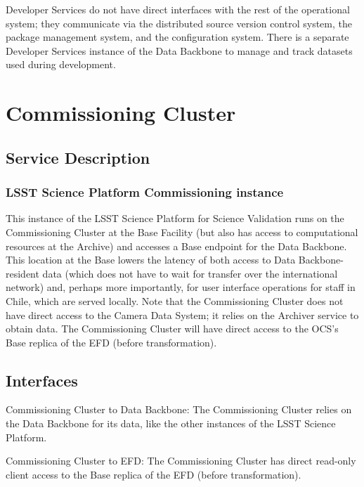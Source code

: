 \documentclass[DM,toc]{lsstdoc}
\begin{document}
Developer Services do not have direct interfaces with the rest of the
operational system; they communicate via the distributed source version control
system, the package management system, and the configuration system.  There is
a separate Developer Services instance of the Data Backbone to manage and track
datasets used during development.


\section{Commissioning Cluster}\label{commissioning-cluster}

\subsection{Service Description}\label{commcluster-service}

\subsubsection{LSST Science Platform Commissioning
instance}\label{lsst-science-platform-commissioning-instance}

This instance of the LSST Science Platform for Science Validation runs
on the Commissioning Cluster at the Base Facility (but also has access
to computational resources at the Archive) and accesses a Base endpoint
for the Data Backbone. This location at the Base lowers the latency of
both access to Data Backbone-resident data (which does not have to wait
for transfer over the international network) and, perhaps more
importantly, for user interface operations for staff in Chile, which are
served locally. Note that the Commissioning Cluster does not have direct
access to the Camera Data System; it relies on the Archiver service to
obtain data. The Commissioning Cluster will have direct access to the
OCS's Base replica of the EFD (before transformation).

\subsection{Interfaces}\label{commcluster-interfaces}

Commissioning Cluster to Data Backbone: The Commissioning Cluster relies on the
Data Backbone for its data, like the other instances of the LSST Science
Platform.

Commissioning Cluster to EFD: The Commissioning Cluster has direct read-only
client access to the Base replica of the EFD (before transformation).
\end{document}
